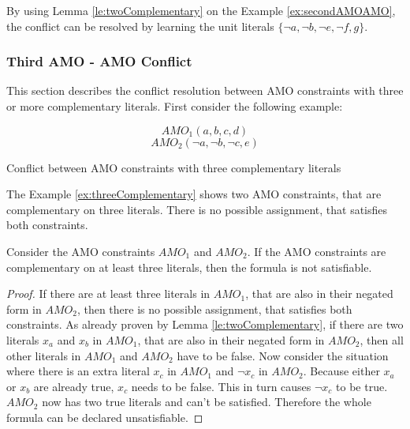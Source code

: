By using Lemma \ref{le:twoComplementary} on the Example \ref{ex:secondAMOAMO}, the conflict can be resolved by learning the unit literals $\{\neg a, \neg b, \neg e, \neg f, g\}$.

\newpage
\subsubsection{Third AMO - AMO Conflict}

This section describes the conflict resolution between AMO constraints with three or more complementary literals. First consider the following example:

\begin{example}
\begin{leftbar}
\begin{displaymath}
AMO_1(a,b,c,d)
\end{displaymath}
\begin{displaymath}
AMO_2(\neg a, \neg b, \neg c, e)
\end{displaymath}
\end{leftbar}
\caption{Conflict between AMO constraints with three complementary literals}
\label{ex:threeComplementary}
\end{example}

The Example \ref{ex:threeComplementary} shows two AMO constraints, that are complementary on three literals. There is no possible assignment, that satisfies both constraints.

\begin{lemma}
\begin{leftbar}
Consider the AMO constraints $AMO_1$ and $AMO_2$. If the AMO constraints are complementary on at least three literals, then the formula is not satisfiable.
\end{leftbar}
\end{lemma}

\begin{proof}
If there are at least three literals in $AMO_1$, that are also in their negated form in $AMO_2$, then there is no possible assignment, that satisfies both constraints. As already proven by Lemma \ref{le:twoComplementary}, if there are two literals $x_a$ and $x_b$ in $AMO_1$, that are also in their negated form in $AMO_2$, then all other literals in $AMO_1$ and $AMO_2$ have to be false. Now consider the situation where there is an extra literal $x_c$ in $AMO_1$ and $\neg x_c$ in $AMO_2$. Because either $x_a$ or $x_b$ are already true, $x_c$ needs to be false. This in turn causes $\neg x_c$ to be true. $AMO_2$ now has two true literals and can't be satisfied. Therefore the whole formula can be declared unsatisfiable.
\end{proof}

